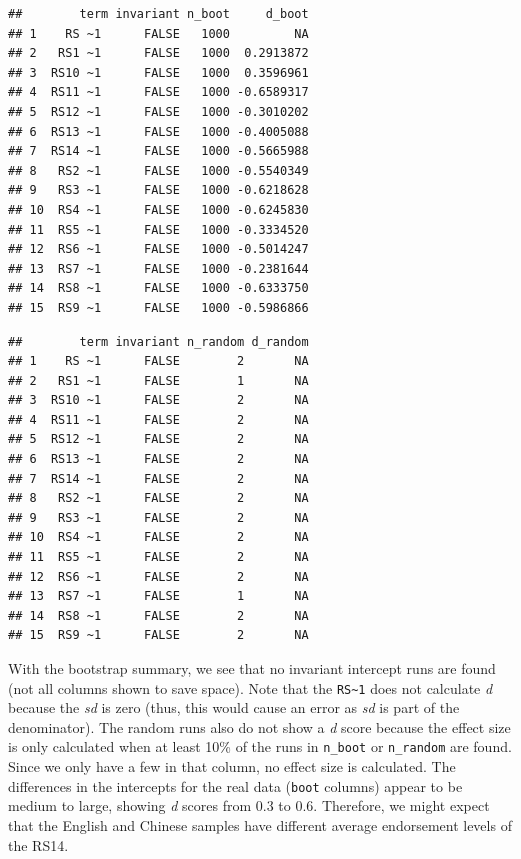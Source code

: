 \documentclass[
  man]{apa7}
\begin{document}
\begin{verbatim}
##        term invariant n_boot     d_boot
## 1    RS ~1      FALSE   1000         NA
## 2   RS1 ~1      FALSE   1000  0.2913872
## 3  RS10 ~1      FALSE   1000  0.3596961
## 4  RS11 ~1      FALSE   1000 -0.6589317
## 5  RS12 ~1      FALSE   1000 -0.3010202
## 6  RS13 ~1      FALSE   1000 -0.4005088
## 7  RS14 ~1      FALSE   1000 -0.5665988
## 8   RS2 ~1      FALSE   1000 -0.5540349
## 9   RS3 ~1      FALSE   1000 -0.6218628
## 10  RS4 ~1      FALSE   1000 -0.6245830
## 11  RS5 ~1      FALSE   1000 -0.3334520
## 12  RS6 ~1      FALSE   1000 -0.5014247
## 13  RS7 ~1      FALSE   1000 -0.2381644
## 14  RS8 ~1      FALSE   1000 -0.6333750
## 15  RS9 ~1      FALSE   1000 -0.5986866
\end{verbatim}

\begin{verbatim}
##        term invariant n_random d_random
## 1    RS ~1      FALSE        2       NA
## 2   RS1 ~1      FALSE        1       NA
## 3  RS10 ~1      FALSE        2       NA
## 4  RS11 ~1      FALSE        2       NA
## 5  RS12 ~1      FALSE        2       NA
## 6  RS13 ~1      FALSE        2       NA
## 7  RS14 ~1      FALSE        2       NA
## 8   RS2 ~1      FALSE        2       NA
## 9   RS3 ~1      FALSE        2       NA
## 10  RS4 ~1      FALSE        2       NA
## 11  RS5 ~1      FALSE        2       NA
## 12  RS6 ~1      FALSE        2       NA
## 13  RS7 ~1      FALSE        1       NA
## 14  RS8 ~1      FALSE        2       NA
## 15  RS9 ~1      FALSE        2       NA
\end{verbatim}

With the bootstrap summary, we see that no invariant intercept runs are found (not all columns shown to save space). Note that the \texttt{RS\textasciitilde{}1} does not calculate \emph{d} because the \emph{sd} is zero (thus, this would cause an error as \emph{sd} is part of the denominator). The random runs also do not show a \emph{d} score because the effect size is only calculated when at least 10\% of the runs in \texttt{n\_boot} or \texttt{n\_random} are found. Since we only have a few in that column, no effect size is calculated. The differences in the intercepts for the real data (\texttt{boot} columns) appear to be medium to large, showing \emph{d} scores from 0.3 to 0.6. Therefore, we might expect that the English and Chinese samples have different average endorsement levels of the RS14.
\end{document}
